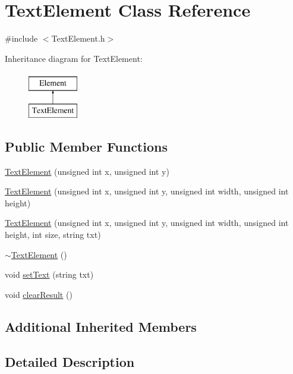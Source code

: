 \hypertarget{class_text_element}{\section{Text\-Element Class Reference}
\label{class_text_element}
}


{\ttfamily \#include $<$Text\-Element.\-h$>$}

Inheritance diagram for Text\-Element\-:\begin{figure}[H]
\begin{center}
\leavevmode
\includegraphics[height=2.000000cm]{class_text_element}
\end{center}
\end{figure}
\subsection*{Public Member Functions}
\begin{DoxyCompactItemize}
\item 
\hyperlink{class_text_element_aec15920e1f8e03bdd865ff3f6e0c396d}{Text\-Element} (unsigned int x, unsigned int y)
\item 
\hyperlink{class_text_element_ace1dec06df5c4a0635a4784b56a52b33}{Text\-Element} (unsigned int x, unsigned int y, unsigned int width, unsigned int height)
\item 
\hyperlink{class_text_element_a288497cfc1863148bfc6ed9d8450f96b}{Text\-Element} (unsigned int x, unsigned int y, unsigned int width, unsigned int height, int size, string txt)
\item 
\hyperlink{class_text_element_a8638bd2628b9a0815bae74a8baf73c1f}{$\sim$\-Text\-Element} ()
\item 
void \hyperlink{class_text_element_a5f6f8013ecd934bd628ecaf6361bf03a}{set\-Text} (string txt)
\item 
void \hyperlink{class_text_element_a2d61f3953226d9d4d06d4003d6c33c34}{clear\-Result} ()
\end{DoxyCompactItemize}
\subsection*{Additional Inherited Members}


\subsection{Detailed Description}


